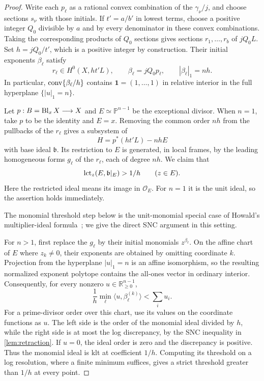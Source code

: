 \begin{proof}
Write each $p_\ell$ as a rational convex combination of the $\gamma_\nu/j$, and choose sections $s_\nu$ with those initials. If $t'=a/b'$ in lowest terms, choose a positive integer $Q_0$ divisible by $a$ and by every denominator in these convex combinations. Taking the corresponding products of $Q_0$ sections gives sections $r_1,\ldots,r_b$ of $jQ_0L$. Set $h=jQ_0/t'$, which is a positive integer by construction. Their initial exponents $\beta_\ell$ satisfy
\begin{equation}
\label{eq:min-product-initials}
 r_\ell\in H^0(X,ht'L),\qquad
 \beta_\ell=jQ_0p_\ell,\qquad |\beta_\ell|_1=nh.
\end{equation}
In particular, $\operatorname{conv}\{\beta_\ell/h\}$ contains $\mathbf1=(1,\ldots,1)$ in relative interior in the full hyperplane $\{|u|_1=n\}$.

Let $p:B=\operatorname{Bl}_xX\longrightarrow X$ and $E\simeq\mathbb{P}^{n-1}$ be the exceptional divisor. When $n=1$, take $p$ to be the identity and $E=x$. Removing the common order $nh$ from the pullbacks of the $r_\ell$ gives a subsystem of
\[
 H=p^*(ht'L)-nhE
\]
with base ideal $\mathfrak{b}$. Its restriction to $E$ is generated, in local frames, by the leading homogeneous forms $g_\ell$ of the $r_\ell$, each of degree $nh$. We claim that
\begin{equation}
\label{eq:min-restricted-threshold}
 \operatorname{lct}_z(E,\mathfrak{b}|_E)>1/h\qquad(z\in E).
\end{equation}
Here the restricted ideal means its image in $\mathcal{O}_E$. For $n=1$ it is the unit ideal, so the assertion holds immediately.

The monomial threshold step below is the unit-monomial special case of Howald's multiplier-ideal formula~\cite[Main Theorem]{howald2001}; we give the direct SNC argument in this setting.

For $n>1$, first replace the $g_\ell$ by their initial monomials $z^{\beta_\ell}$. On the affine chart of $E$ where $z_k\ne0$, their exponents are obtained by omitting coordinate $k$. Projection from the hyperplane $|u|_1=n$ is an affine isomorphism, so the resulting normalized exponent polytope contains the all-ones vector in ordinary interior. Consequently, for every nonzero $u\in\mathbb{R}_{\geq0}^{n-1}$,
\begin{equation}
\label{eq:min-monomial-strict}
 \frac1h\min_\ell\langle u,\beta_\ell^{(k)}\rangle
       <\sum_i u_i.
\end{equation}
For a prime-divisor order over this chart, use its values on the coordinate functions as $u$. The left side is the order of the monomial ideal divided by $h$, while the right side is at most the log discrepancy, by the SNC inequality in \cref{lem:retraction}. If $u=0$, the ideal order is zero and the discrepancy is positive. Thus the monomial ideal is klt at coefficient $1/h$. Computing its threshold on a log resolution, where a finite minimum suffices, gives a strict threshold greater than $1/h$ at every point.


\end{proof}
